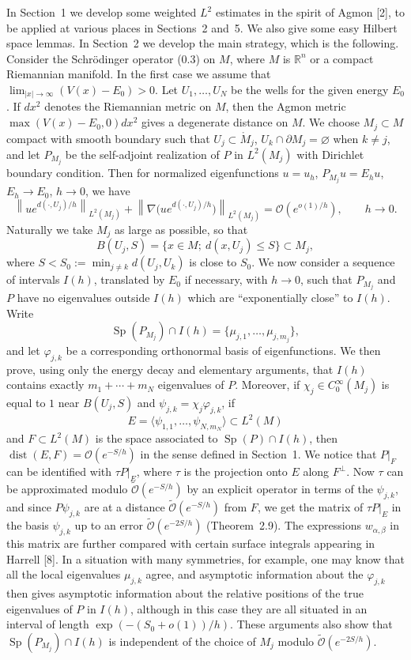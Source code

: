 \documentclass[11pt,a4paper]{article}
\newcommand{\R}{\mathbb R}
\newcommand{\Sp}{\operatorname{Sp}}
\newcommand{\dist}{\operatorname{dist}}
\newcommand{\cO}{\mathcal O}
\newcommand{\Ot}{\widetilde{\mathcal O}}
\newcommand{\norm}[1]{\left\lVert #1\right\rVert}
\numberwithin{equation}{section}
\theoremstyle{remark}
\begin{document}
In Section~1 we develop some weighted $L^2$ estimates in the spirit of Agmon [2], to be applied at various places in Sections~2 and~5. We also give some easy Hilbert space lemmas. In Section~2 we develop the main strategy, which is the following. Consider the Schr\"odinger operator (0.3) on $M$, where $M$ is $\R^n$ or a compact Riemannian manifold. In the first case we assume that $\lim_{|x|\to\infty}(V(x)-E_0)>0$. Let $U_1,\ldots,U_N$ be the wells for the given energy $E_0$. If $dx^2$ denotes the Riemannian metric on $M$, then the Agmon metric $\max(V(x)-E_0,0)dx^2$ gives a degenerate distance on $M$. We choose $M_j\subset M$ compact with smooth boundary such that $U_j\subset\mathring M_j$, $U_k\cap\partial M_j=\varnothing$ when $k\ne j$, and let $P_{M_j}$ be the self-adjoint realization of $P$ in $L^2(M_j)$ with Dirichlet boundary condition. Then for normalized eigenfunctions $u=u_h$, $P_{M_j}u=E_hu$, $E_h\to E_0$, $h\to0$, we have
\begin{equation}
\norm{u e^{d(\cdot,U_j)/h}}_{L^2(M_j)}+
\norm{\nabla\bigl(u e^{d(\cdot,U_j)/h}\bigr)}_{L^2(M_j)}
=\cO\!\left(e^{o(1)/h}\right),\qquad h\to0.
\end{equation}
Naturally we take $M_j$ as large as possible, so that
\[
B(U_j,S)=\{x\in M;\ d(x,U_j)\le S\}\subset M_j,
\]
where $S<S_0:=\min_{j\ne k}d(U_j,U_k)$ is close to $S_0$. We now consider a sequence of intervals $I(h)$, translated by $E_0$ if necessary, with $h\to0$, such that $P_{M_j}$ and $P$ have no eigenvalues outside $I(h)$ which are ``exponentially close'' to $I(h)$. Write
\[
\Sp(P_{M_j})\cap I(h)=\{\mu_{j,1},\ldots,\mu_{j,m_j}\},
\]
and let $\varphi_{j,k}$ be a corresponding orthonormal basis of eigenfunctions. We then prove, using only the energy decay and elementary arguments, that $I(h)$ contains exactly $m_1+\cdots+m_N$ eigenvalues of $P$. Moreover, if $\chi_j\in C_0^\infty(M_j)$ is equal to $1$ near $B(U_j,S)$ and $\psi_{j,k}=\chi_j\varphi_{j,k}$, if
\[
E=\langle\psi_{1,1},\ldots,\psi_{N,m_N}\rangle\subset L^2(M)
\]
and $F\subset L^2(M)$ is the space associated to $\Sp(P)\cap I(h)$, then $\dist(E,F)=\cO(e^{-S/h})$ in the sense defined in Section~1. We notice that $P|_F$ can be identified with $\tau P|_E$, where $\tau$ is the projection onto $E$ along $F^\perp$. Now $\tau$ can be approximated modulo $\Ot(e^{-S/h})$ by an explicit operator in terms of the $\psi_{j,k}$, and since $P\psi_{j,k}$ are at a distance $\Ot(e^{-S/h})$ from $F$, we get the matrix of $\tau P|_E$ in the basis $\psi_{j,k}$ up to an error $\Ot(e^{-2S/h})$ (Theorem~2.9). The expressions $w_{\alpha,\beta}$ in this matrix are further compared with certain surface integrals appearing in Harrell [8]. In a situation with many symmetries, for example, one may know that all the local eigenvalues $\mu_{j,k}$ agree, and asymptotic information about the $\varphi_{j,k}$ then gives asymptotic information about the relative positions of the true eigenvalues of $P$ in $I(h)$, although in this case they are all situated in an interval of length $\exp(-(S_0+o(1))/h)$. These arguments also show that $\Sp(P_{M_j})\cap I(h)$ is independent of the choice of $M_j$ modulo $\Ot(e^{-2S/h})$.
\end{document}
